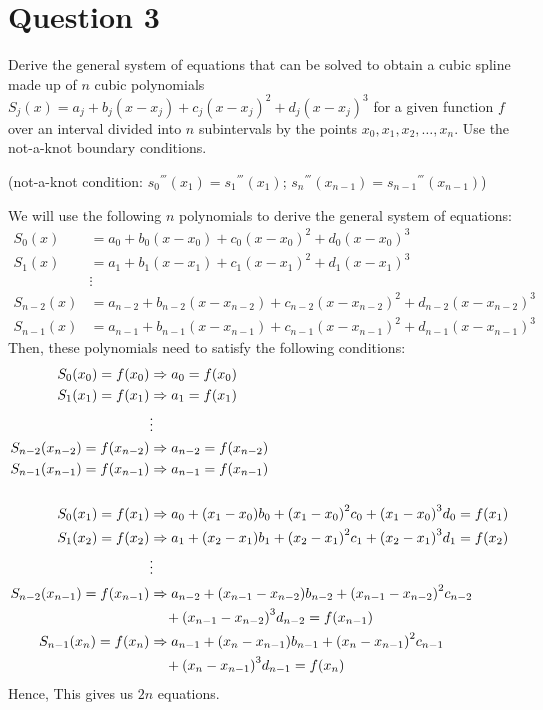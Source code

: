 \section{Question 3}

\begin{question}
    Derive the general system of equations that can be solved to obtain a cubic spline made up of $n$ cubic polynomials $S_j(x) = a_j+b_j(x-x_j)+c_j(x-x_j)^2+d_j(x-x_j)^3$ for a given function $f$ over an interval divided into $n$ subintervals by the points $x_0, x_1, x_2, \dots, x_n$. Use the not-a-knot boundary conditions.
    
    (not-a-knot condition: ${s_0}^{'''}(x_1) = {s_1}^{'''}(x_1)$; ${s_n}^{'''}(x_{n-1}) = {s_{n-1}}^{'''}(x_{n-1})$)
\end{question}

\begin{answer}
    We will use the following $n$ polynomials to derive the general system of equations:
    \begin{align}
        S_0(x) &= a_0 + b_0(x-x_0) + c_0(x-x_0)^2 + d_0(x-x_0)^3\\
        S_1(x) &= a_1 + b_1(x-x_1) + c_1(x-x_1)^2 + d_1(x-x_1)^3\\
        &\vdots\\
        S_{n-2}(x) &= a_{n-2} + b_{n-2}(x-x_{n-2}) + c_{n-2}(x-x_{n-2})^2 + d_{n-2}(x-x_{n-2})^3\\
        S_{n-1}(x) &= a_{n-1} + b_{n-1}(x-x_{n-1}) + c_{n-1}(x-x_{n-1})^2 + d_{n-1}(x-x_{n-1})^3
    \end{align}
    Then, these polynomials need to satisfy the following conditions:
    \begin{align}
        S_0(x_0) = f(x_0) &\Rightarrow a_0 = f(x_0)\\
        S_1(x_1) = f(x_1) &\Rightarrow a_1 = f(x_1)\\
        &\vdots\\
        S_{n-2}(x_{n-2}) = f(x_{n-2}) &\Rightarrow a_{n-2} = f({x_{n-2}})\\
        S_{n-1}(x_{n-1}) = f(x_{n-1}) &\Rightarrow a_{n-1} = f({x_{n-1}})\\
        &\newline\\
        S_0(x_1) = f(x_1) &\Rightarrow a_0 + (x_1-x_0)b_0 + {(x_1-x_0)}^2c_0 + {(x_1-x_0)}^3d_0 = f(x_1)\\
        S_1(x_2) = f(x_2) &\Rightarrow a_1 + (x_2-x_1)b_1 + {(x_2-x_1)}^2c_1 + {(x_2-x_1)}^3d_1 = f(x_2)\\
        &\vdots\\
        S_{n-2}(x_{n-1}) = f(x_{n-1}) &\Rightarrow a_{n-2} + (x_{n-1} - x_{n-2})b_{n-2} + {(x_{n-1}-x_{n-2})}^2c_{n-2}\\
        & \;\;\;\; + {(x_{n-1} - x_{n-2})}^3d_{n-2} = f(x_{n-1})\\
        S_{n-1}(x_n) = f(x_n) &\Rightarrow a_{n-1} + (x_n - x_{n-1})b_{n-1} + {(x_n-x_{n-1})}^2c_{n-1}\\
        & \;\;\;\; + {(x_n - x_{n-1})}^3d_{n-1} = f(x_n)
    \end{align}
    Hence, This gives us $2n$ equations.
    

\end{answer}
